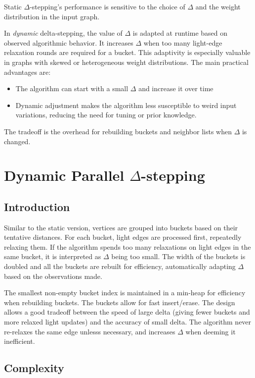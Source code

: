 \documentclass[12pt]{article}
\begin{document}
Static $\Delta$-stepping's performance is sensitive to the choice of $\Delta$ and the weight distribution in the input graph.

In \emph{dynamic} delta-stepping, the value of $\Delta$ is adapted at runtime based on observed algorithmic behavior. It increases $\Delta$ when too many light-edge relaxation rounds are required for a bucket. This adaptivity is especially valuable in graphs with skewed or heterogeneous weight distributions. The main practical advantages are:
\begin{itemize}
    \item The algorithm can start with a small $\Delta$ and increase it over time
    \item Dynamic adjustment makes the algorithm less susceptible to weird input variations, reducing the need for tuning or prior knowledge.
\end{itemize}

The tradeoff is the overhead for rebuilding buckets and neighbor lists when $\Delta$ is changed.





\section{Dynamic Parallel $\Delta$-stepping}
\subsection{Introduction}
Similar to the static version, vertices are grouped into buckets based on their tentative distances. For each bucket, light edges are processed first, repeatedly relaxing them. If the algorithm spends too many relaxations on light edges in the same bucket, it is interpreted as $\Delta$ being too small. The width of the buckets is doubled and all the buckets are rebuilt for efficiency, automatically adapting $\Delta$ based on the observations made.

The smallest non-empty bucket index is maintained in a min-heap for efficiency when rebuilding buckets. The buckets allow for fast insert/erase. The design allows a good tradeoff between the speed of large delta (giving fewer buckets and more relaxed light updates) and the accuracy of small delta. The algorithm never re-relaxes the same edge unlesss necessary, and increases $\Delta$ when deeming it inefficient.

\subsection{Complexity}
\end{document}
